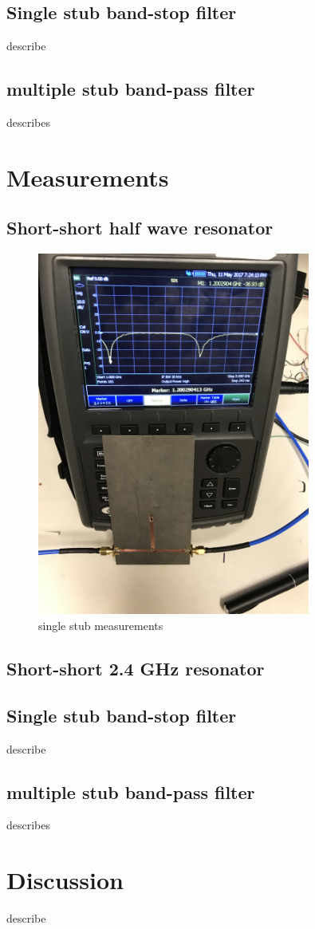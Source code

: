 \documentclass[letterpaper, 12pt]{article}
\begin{document}
\subsection{Single stub band-stop filter}
describe
\subsection{multiple stub band-pass filter}
describes
\section{Measurements}

\subsection{Short-short half wave resonator}
\begin{figure}
    \centering
    \includegraphics[width=0.8\textwidth, angle=270]{1stub}
    \caption {single stub measurements}
\end{figure}
\subsection{Short-short 2.4 GHz resonator}


\subsection{Single stub band-stop filter}
describe
\subsection{multiple stub band-pass filter}
describes

\section{Discussion}
describe
\end{document}
